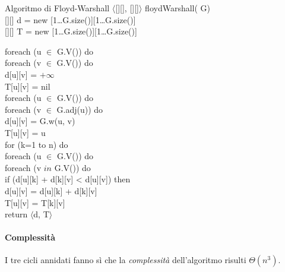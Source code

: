 \begin{minicode}{Algoritmo di Floyd-Warshall}
\ind$\langle$[][], [][]$\rangle$ floydWarshall( G)\\
    [][] d = new [1\dots G.size()][1\dots G.size()]\\
    [][] T = new [1\dots G.size()][1\dots G.size()]\\
\end{minicode}
\newpage
\begin{codecont}
\indent foreach (u $\in$ G.V()) do\\
    \indf foreach (v $\in$ G.V()) do\\
        \indff d[u][v] = $+\infty$\\
        \indff T[u][v] = nil\\
\ind foreach (u $\in$ G.V()) do\\
    \indf foreach (v $\in$ G.adj(u)) do\\
            \indff d[u][v] = G.w(u, v)\\
            \indff T[u][v] = u\\
\ind for (k=1 to n) do\\
    \indf foreach (u $\in$ G.V()) do\\
        \indff foreach (v $in$ G.V()) do\\
            \indfff if (d[u][k] + d[k][v] < d[u][v]) then\\
                \indffff d[u][v] = d[u][k] + d[k][v]\\
                \indffff T[u][v] = T[k][v]\\
\indent return $\langle$d, T$\rangle$
\end{codecont}

\paragraph{Complessità}
I tre cicli annidati fanno sì che la \emph{complessità} dell'algoritmo risulti
$\Theta(n^3)$.